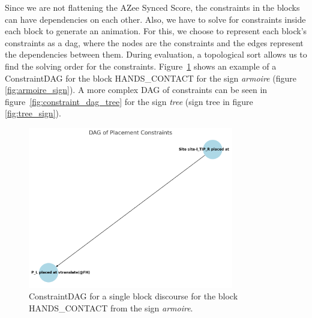 \documentclass[../../main.tex]{subfiles}
\begin{document}
Since we are not flattening the AZee Synced Score, the constraints in the blocks can have dependencies on each other. Also, we have to solve for constraints inside each block to generate an animation. For this, we choose to represent each block's constraints as a \gls{dag}, where the nodes are the constraints and the edges represent the dependencies between them. During evaluation, a topological sort allows us to find the solving order for the constraints. Figure~\ref{fig:constraint_dag_armoire} shows an example of a ConstraintDAG for the block HANDS\_CONTACT for the sign \emph{armoire} (figure \ref{fig:armoire_sign}). A more complex DAG of constraints can be seen in figure~\ref{fig:constraint_dag_tree} for the sign \emph{tree} (sign tree in figure \ref{fig:tree_sign}).

\begin{figure}[h]
    \centering
    \includegraphics[width=0.8\textwidth]{chapters/multi_track/images/constraint_dag_cupboard.png}
    \caption{ConstraintDAG for a single block discourse for the block HANDS\_CONTACT from the sign \emph{armoire}.}
    \label{fig:constraint_dag_armoire}
\end{figure}
\end{document}
